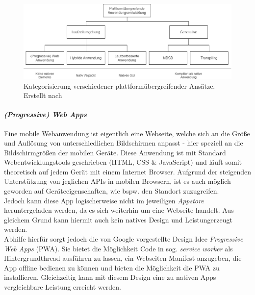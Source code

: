\begin{figure}[h]
	\begin{center}
		\includegraphics[scale=0.47]{images/crossplattform_unterteilung.png}
	\end{center}
	\caption{Kategorisierung verschiedener plattformübergreifender Ansätze. Erstellt nach \cite{majchrzak2015} \protect}
	\label{fig:crossplattform_architecture}
\end{figure}

\paragraph{\textit{(Progressive) Web Apps}}
Eine mobile Webanwendung ist eigentlich eine Webseite, welche sich an die Größe und Auflösung von unterschiedlichen Bildschirmen anpasst - hier speziell an die Bildschirmgrößen der mobilen Geräte. Diese Anwendung ist mit Standard Webentwicklungstools geschrieben (HTML, CSS \& JavaScript) und läuft somit theoretisch auf jedem Gerät mit einem Internet Browser. \cite{charland2011}
Aufgrund der steigenden Unterstützung von jeglichen APIs in mobilen Browsern, ist es auch möglich geworden auf Geräteeigenschaften, wie bspw. den Standort zuzugreifen.\\
Jedoch kann diese App logischerweise nicht im jeweiligen \textit{Appstore} heruntergeladen werden, da es sich weiterhin um eine Webseite handelt.
Aus gleichem Grund kann hiermit auch kein \glqq natives Design und Leistung\grqq erzeugt werden.\\

Abhilfe hierfür sorgt jedoch die von Google vorgestellte Design Idee \textit{Progressive Web Apps} (PWA). Sie bietet die Möglichkeit Code in sog. \textit{service worker} als Hintergrundthread ausführen zu lassen, ein Webseiten Manifest anzugeben, die App offline bedienen zu können und bieten die Möglichkeit die PWA zu installieren. Gleichzeitig kann mit diesem Design eine zu nativen Apps vergleichbare Leistung erreicht werden.\cite{bjorn-hansen2020} \\

